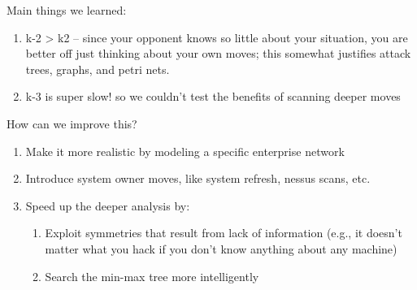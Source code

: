 Main things we learned:
\begin{enumerate}
\item k-2 > k2 -- since your opponent knows so little about your situation, you are better off just thinking about your own moves; this somewhat justifies attack trees, graphs, and petri nets.
\item k-3 is super slow! so we couldn't test the benefits of scanning deeper moves
\end{enumerate}



How can we improve this?
\begin{enumerate}
\item Make it more realistic by modeling a specific enterprise network
\item Introduce system owner moves, like system refresh, nessus scans, etc.
\item Speed up the deeper analysis by:
\begin{enumerate}
  \item Exploit symmetries that result from lack of information (e.g., it doesn't matter what you hack if you don't know anything about any machine)
  \item Search the min-max tree more intelligently
\end{enumerate}
\end{enumerate}
